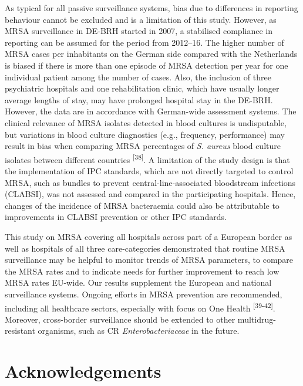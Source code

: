 \documentclass[
]{book}
\begin{document}
As typical for all passive surveillance systems, bias due to differences in reporting behaviour cannot be excluded and is a limitation of this study. However, as MRSA surveillance in DE-BRH started in 2007, a stabilised compliance in reporting can be assumed for the period from 2012--16. The higher number of MRSA cases per inhabitants on the German side compared with the Netherlands is biased if there is more than one episode of MRSA detection per year for one individual patient among the number of cases. Also, the inclusion of three psychiatric hospitals and one rehabilitation clinic, which have usually longer average lengths of stay, may have prolonged hospital stay in the DE-BRH. However, the data are in accordance with German-wide assessment systems. The clinical relevance of MRSA isolates detected in blood cultures is undisputable, but variations in blood culture diagnostics (e.g., frequency, performance) may result in bias when comparing MRSA percentages of \emph{S. aureus} blood culture isolates between different countries \textsuperscript{{[}38{]}}. A limitation of the study design is that the implementation of IPC standards, which are not directly targeted to control MRSA, such as bundles to prevent central-line-associated bloodstream infections (CLABSI), was not assessed and compared in the participating hospitals. Hence, changes of the incidence of MRSA bacteraemia could also be attributable to improvements in CLABSI prevention or other IPC standards.

This study on MRSA covering all hospitals across part of a European border as well as hospitals of all three care-categories demonstrated that routine MRSA surveillance may be helpful to monitor trends of MRSA parameters, to compare the MRSA rates and to indicate needs for further improvement to reach low MRSA rates EU-wide. Our results supplement the European and national surveillance systems. Ongoing efforts in MRSA prevention are recommended, including all healthcare sectors, especially with focus on One Health \textsuperscript{{[}39-42{]}}. Moreover, cross-border surveillance should be extended to other multidrug-resistant organisms, such as CR \emph{Enterobacteriaceae} in the future.

\hypertarget{acknowledgements-4}{%
\section*{Acknowledgements}\label{acknowledgements-4}}
\end{document}
